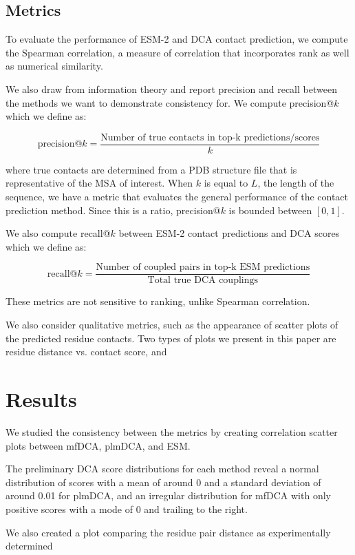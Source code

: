 \documentclass{article}
\begin{document}
\subsection{Metrics}
To evaluate the performance of ESM-2 and DCA contact prediction, we compute the Spearman correlation, a measure of correlation that incorporates rank as well as numerical similarity. 

We also draw from information theory and report precision and recall between the methods we want to demonstrate consistency for. We compute precision@$k$ which we define as:

$$\text{precision@}k = \frac{\text{Number of true contacts in top-k predictions/scores}}{k} $$

\noindent where true contacts are determined from a PDB structure file that is representative of the MSA of interest. When $k$ is equal to $L$, the length of the sequence, we have a metric that evaluates the general performance of the contact prediction method. Since this is a ratio, precision@$k$ is bounded between $\left[0,1\right]$.

We also compute recall@$k$ between ESM-2 contact predictions and DCA scores which we define as:

$$\text{recall@}k = \frac{\text{Number of coupled pairs in top-k ESM predictions}}{\text{Total true DCA couplings}} $$

These metrics are not sensitive to ranking, unlike Spearman correlation. 

We also consider qualitative metrics, such as the appearance of scatter plots of the predicted residue contacts. Two types of plots we present in this paper are residue distance vs. contact score, and 


\noindent 
\section{Results}

We studied the consistency between the metrics by creating correlation scatter plots between mfDCA, plmDCA, and ESM.

The preliminary DCA score distributions for each method reveal a normal distribution of scores with a mean of around 0 and a standard deviation of around 0.01 for plmDCA, and an irregular distribution for mfDCA with only positive scores with a mode of 0 and trailing to the right. 

We also created a plot comparing the residue pair distance as experimentally determined 
\end{document}
